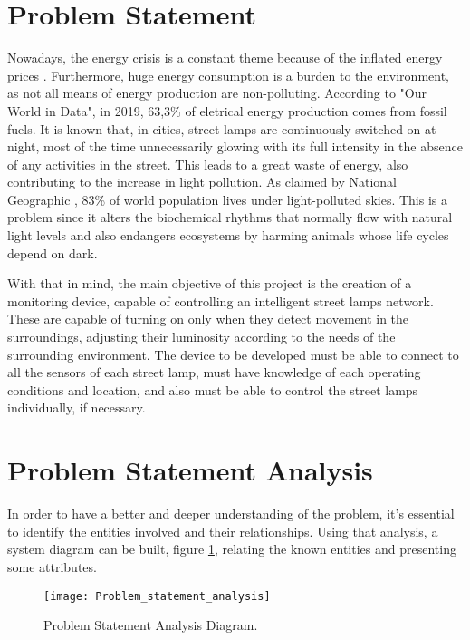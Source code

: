 \section{Problem Statement}
Nowadays, the energy crisis is a constant theme because of the inflated energy prices \cite{energy_crisis}. Furthermore, huge energy consumption is a burden to the environment, as not all means of energy production are non-polluting. According to "Our World in Data"\cite{owidenergy}, in 2019, 63,3\% of eletrical energy production comes from fossil fuels. It is known that, in cities, street lamps are continuously switched on at night, most of the time unnecessarily glowing with its full intensity in the absence of any activities in the street.  This leads to a great waste of energy, also contributing to the increase in light pollution. As claimed by National Geographic \cite{light_pollution}, 83\% of world population lives under light-polluted skies. This is a problem since it alters the biochemical rhythms that normally flow with natural light levels and also endangers ecosystems by harming animals whose life cycles depend on dark.

With that in mind, the main objective of this project is the creation of a monitoring device, capable of controlling an intelligent street lamps network. These are capable of turning on only when they detect movement in the surroundings, adjusting their luminosity according to the needs of the surrounding environment. The device to be developed must be able to connect to all the sensors of each street lamp, must have knowledge of each operating conditions and location, and also must be able to control the street lamps individually, if necessary.

\section{Problem Statement Analysis}
In order to have a better and deeper understanding of the problem, it’s essential to identify the entities involved and their relationships. Using that analysis, a system diagram can be built, figure \ref{fig:Problem_statement_analysis}, relating the known entities and presenting some attributes.

\begin{figure}[ht]
	\centering
	\texttt{[image: Problem\_statement\_analysis]}
	\caption{Problem Statement Analysis Diagram.}
	\label{fig:Problem_statement_analysis}
\end{figure}

